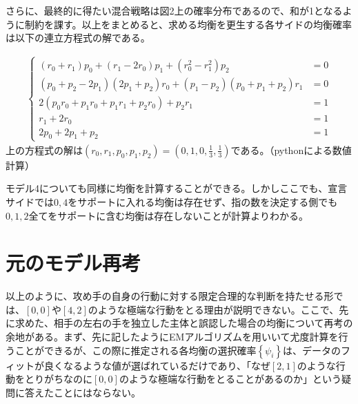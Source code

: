 \documentclass{jsarticle}
\begin{document}
さらに、最終的に得たい混合戦略は図2上の確率分布であるので、和が1となるように制約を課す。以上をまとめると、求める均衡を更生する各サイドの均衡確率は以下の連立方程式の解である。

\begin{align*}
	\begin{cases}
		(r_0 + r_1)p_0 + (r_1 - 2r_0)p_1 + (r_0^2 - r_1^2)p_2&= 0\\
		(p_0 + p_2 - 2p_1)(2p_1 + p_2)r_0 + (p_1 - p_2)(p_0 + p_1 + p_2)r_1 &= 0\\
		2(p_0r_0 + p_1r_0 + p_1r_1 + p_2r_0) + p_2r_1 &= 1\\
		r_1 + 2r_0 &= 1\\
		2p_0 + 2p_1 + p_2 &= 1
	\end{cases}
\end{align*}
上の方程式の解は$(r_0, r_1,p_0, p_1, p_2) = (0, 1, 0, \frac{1}{3}, \frac{1}{3})$である。（pythonによる数値計算）

モデル4についても同様に均衡を計算することができる。しかしここでも、宣言サイドでは$0,4$をサポートに入れる均衡は存在せず、指の数を決定する側でも$0,1,2$全てをサポートに含む均衡は存在しないことが計算よりわかる。

\section{元のモデル再考}
以上のように、攻め手の自身の行動に対する限定合理的な判断を持たせる形では、$[0,0]$や$[4,2]$のような極端な行動をとる理由が説明できない。ここで、先に求めた、相手の左右の手を独立した主体と誤認した場合の均衡について再考の余地がある。まず、先に記したようにEMアルゴリズムを用いいて尤度計算を行うことができるが、この際に推定される各均衡の選択確率$\left\{ \psi_i \right\}$は、データのフィットが良くなるような値が選ばれているだけであり、「なぜ$[2,1]$のような行動をとりがちなのに$[0,0]$のような極端な行動をとることがあるのか」という疑問に答えたことにはならない。
\end{document}
